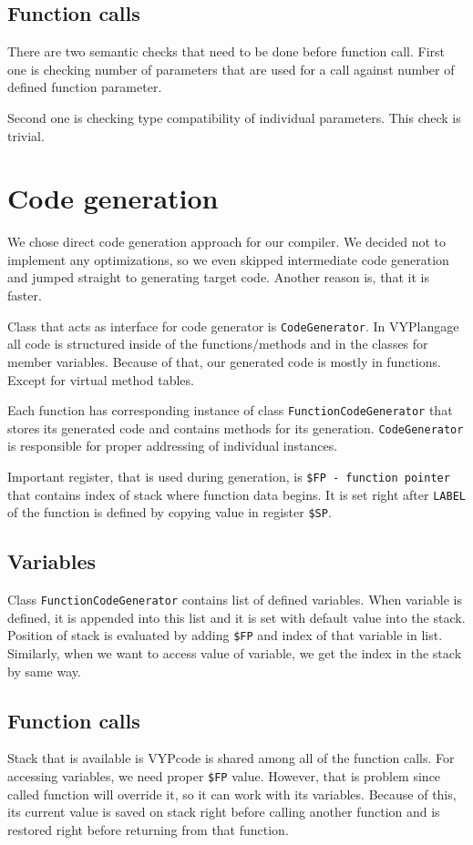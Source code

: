 \documentclass[a4paper, 11pt]{article}
\begin{document}
\subsection*{Function calls}
There are two semantic checks that need to be done before function call. First one is checking number of parameters that are used for a call against number of defined function parameter.

Second one is checking type compatibility of individual parameters. This check is trivial.

\section{Code generation}
We chose direct code generation approach for our compiler. We decided not to implement any optimizations, so we even skipped intermediate code generation and jumped straight to generating target code. Another reason is, that it is faster.

Class that acts as interface for code generator is \texttt{CodeGenerator}. In VYPlangage all code is structured inside of the functions/methods and in the classes for member variables. Because of that, our generated code is mostly in functions. Except for virtual method tables.

Each function has corresponding instance of class \texttt{FunctionCodeGenerator} that stores its generated code and contains methods for its generation. \texttt{CodeGenerator} is responsible for proper addressing of individual instances.

Important register, that is used during generation, is \texttt{\$FP - function pointer} that contains index of stack where function data begins. It is set right after \texttt{LABEL} of the function is defined by copying value in register \texttt{\$SP}.

\subsection*{Variables}
Class \texttt{FunctionCodeGenerator} contains list of defined variables. When variable is defined, it is appended into this list and it is set with default value into the stack. Position of stack is evaluated by adding \texttt{\$FP} and index of that variable in list. Similarly, when we want to access value of variable, we get the index in the stack by same way.

\subsection*{Function calls}
Stack that is available is VYPcode is shared among all of the function calls. For accessing variables, we need proper \texttt{\$FP} value. However, that is problem since called function will override it, so it can work with its variables. Because of this, its current value is saved on stack right before calling another function and is restored right before returning from that function.
\end{document}
